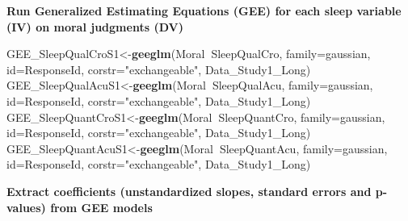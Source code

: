 \documentclass[
]{book}
\newenvironment{Shaded}{\begin{snugshade}}{\end{snugshade}}
\newcommand{\DataTypeTok}[1]{\textcolor[rgb]{0.13,0.29,0.53}{#1}}
\newcommand{\KeywordTok}[1]{\textcolor[rgb]{0.13,0.29,0.53}{\textbf{#1}}}
\newcommand{\NormalTok}[1]{#1}
\newcommand{\OperatorTok}[1]{\textcolor[rgb]{0.81,0.36,0.00}{\textbf{#1}}}
\newcommand{\StringTok}[1]{\textcolor[rgb]{0.31,0.60,0.02}{#1}}
\begin{document}
\textbf{Run Generalized Estimating Equations (GEE) for each sleep variable (IV) on moral judgments (DV)}

\begin{Shaded}
\begin{Highlighting}[]
\NormalTok{GEE_SleepQualCroS1<-}\KeywordTok{geeglm}\NormalTok{(Moral}\OperatorTok{~}\NormalTok{SleepQualCro, }\DataTypeTok{family=}\NormalTok{gaussian, }\DataTypeTok{id=}\NormalTok{ResponseId, }\DataTypeTok{corstr=}\StringTok{"exchangeable"}\NormalTok{, Data_Study1_Long)}
\NormalTok{GEE_SleepQualAcuS1<-}\KeywordTok{geeglm}\NormalTok{(Moral}\OperatorTok{~}\NormalTok{SleepQualAcu, }\DataTypeTok{family=}\NormalTok{gaussian, }\DataTypeTok{id=}\NormalTok{ResponseId, }\DataTypeTok{corstr=}\StringTok{"exchangeable"}\NormalTok{, Data_Study1_Long)}
\NormalTok{GEE_SleepQuantCroS1<-}\KeywordTok{geeglm}\NormalTok{(Moral}\OperatorTok{~}\NormalTok{SleepQuantCro, }\DataTypeTok{family=}\NormalTok{gaussian, }\DataTypeTok{id=}\NormalTok{ResponseId, }\DataTypeTok{corstr=}\StringTok{"exchangeable"}\NormalTok{, Data_Study1_Long)}
\NormalTok{GEE_SleepQuantAcuS1<-}\KeywordTok{geeglm}\NormalTok{(Moral}\OperatorTok{~}\NormalTok{SleepQuantAcu, }\DataTypeTok{family=}\NormalTok{gaussian, }\DataTypeTok{id=}\NormalTok{ResponseId, }\DataTypeTok{corstr=}\StringTok{"exchangeable"}\NormalTok{, Data_Study1_Long)}
\end{Highlighting}
\end{Shaded}

\textbf{Extract coefficients (unstandardized slopes, standard errors and p-values) from GEE models }
\end{document}
